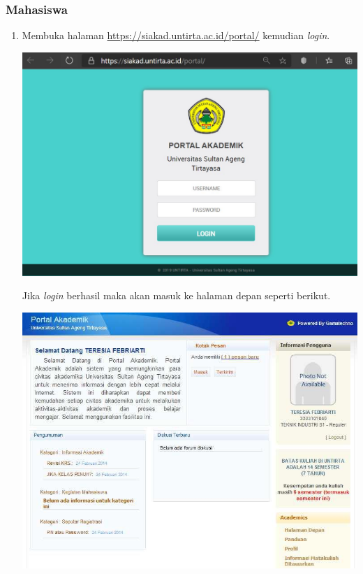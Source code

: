 \documentclass[
]{book}
\begin{document}
\hypertarget{mahasiswa}{%
\subsubsection{Mahasiswa}\label{mahasiswa}}

\begin{enumerate}
\def\labelenumi{\arabic{enumi}.}
\item
  Membuka halaman \url{https://siakad.untirta.ac.id/portal/} kemudian \emph{login}.

  \includegraphics[width=8.33333in,height=\textheight]{static/3.1.JPG}

  Jika \emph{login} berhasil maka akan masuk ke halaman depan seperti berikut.

  \includegraphics[width=8.33333in,height=\textheight]{static/3.2.jpg}


\end{enumerate}
\end{document}
